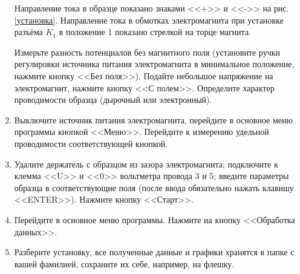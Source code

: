 \documentclass[a4paper,12pt]{article} %
\begin{document}
\begin{enumerate}
Направление тока в образце показано знаками <<+>> и <<->> на рис. \ref{установка}.
Направление тока в обмотках электромагнита при установке разъёма $K_1$ в положение 1 показано стрелкой на торце магнита. 

Измерьте разность потенциалов без магнитного поля (установите ручки регулировки источника питания электромагнита в минимальное положение, нажмите кнопку <<Без поля>>). Подайте небольшое напряжение на электромагнит, нажмите кнопку <<С полем>>. Определите характер проводимости образца (дырочный или электронный). 

\item Выключите источник питания электромагнита, перейдите в основное меню программы кнопкой <<Меню>>. Перейдите к измерению удельной проводимости соответствующей кнопкой.
\item Удалите держатель с образцом из зазора электромагнита; подключите к клемма <<U>> и <<0>> вольтметра провода 3 и 5; введите параметры образца в соответствующие поля (после ввода обязательно нажать клавишу <<ENTER>>). Нажмите кнопку <<Старт>>.
\item Перейдите в основное меню программы. Нажмите на кнопку <<Обработка данных>>. 
\item Разберите установку, все полученные данные и графики хранятся в папке с вашей фамилией, сохраните их себе, например, на флешку.
  
\end{enumerate}
\end{document}

